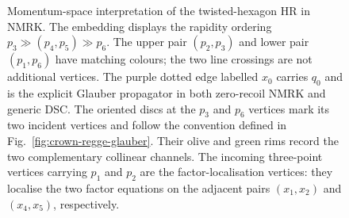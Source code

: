 \documentclass[a4paper,11pt]{article}
\newcommand{\GlauberVertex}[3][blue]{%
 \begin{scope}[shift={#2},rotate=#3]
  \draw[fill=GreenYellow,draw=#1,line width=.55mm] (0,0) circle (6pt);
  \draw[->,>=stealth,draw=#1,line width=.75pt]
    (-4.2pt,0)--(4.2pt,0);
 \end{scope}%
}
\begin{document}
\begin{figure}[htbp]
\caption{Momentum-space interpretation of the twisted-hexagon HR in NMRK.
The embedding displays the rapidity ordering
\(p_3\gg(p_4,p_5)\gg p_6\).  The upper pair \((p_2,p_3)\) and lower
pair \((p_1,p_6)\) have matching colours; the two line crossings are not
additional vertices.  The purple dotted edge labelled \(x_0\) carries
\(q_0\) and is the explicit Glauber propagator in both zero-recoil NMRK
and generic DSC.  The oriented discs at the \(p_3\) and \(p_6\) vertices
mark its two incident vertices and follow the convention defined in
Fig.~\ref{fig:crown-regge-glauber}.  Their olive and green rims record the two
complementary collinear channels.  The incoming three-point vertices carrying \(p_1\) and \(p_2\)
are the factor-localisation vertices: they localise the two factor equations
on the adjacent pairs \((x_1,x_2)\) and \((x_4,x_5)\), respectively.}
\label{fig:one-loop-hexagon}
\end{figure}
\end{document}
